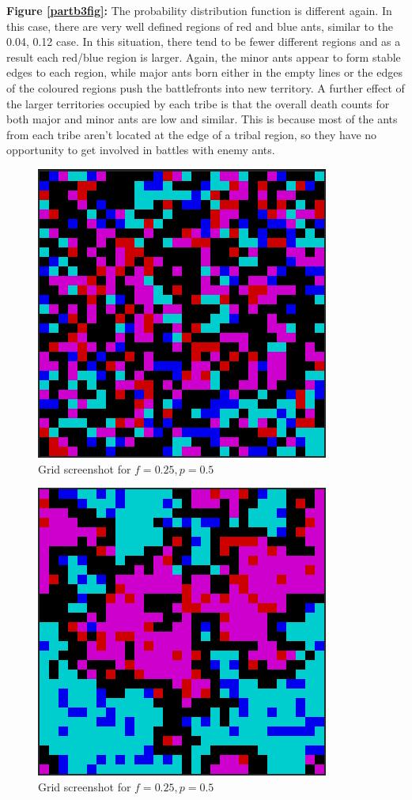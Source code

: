\begin{enumerate}
\textbf{Figure \ref{partb3fig}:} The probability distribution function is
different again.  In this case, there are very well defined 
regions of red and blue ants, similar to the 0.04, 0.12 case.  In this 
situation, there tend to be fewer different regions and as a result each 
red/blue region is larger.  Again, the minor ants appear to form stable edges 
to each region, while major ants born either in the empty lines or the edges of 
the coloured regions push the battlefronts into new territory.  A further 
effect of the larger territories occupied by each tribe is that the overall 
death counts for both major and minor ants are low and similar.  This is 
because most of the ants from each tribe aren't located at the edge of a tribal 
region, so they have no opportunity to get involved in battles with enemy ants.

\begin{figure}[h!]
\centering
\includegraphics[scale=1.0]{partb1scrot1.png}
\caption{Grid screenshot for $f = 0.25, p = 0.5$}
\label{scrot1}
\end{figure}

\begin{figure}[h!]
\centering
\includegraphics[scale=1.0]{partb2scrot1.png}
\caption{Grid screenshot for $f = 0.25, p = 0.5$}
\label{scrot2}
\end{figure}


\end{enumerate}
